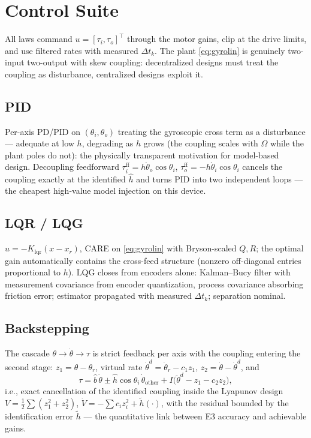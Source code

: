 \documentclass[conference]{IEEEtran}
\begin{document}
\section{Control Suite}
All laws command $u = [\tau_i, \tau_o]^{\!\top}$ through the motor gains, clip at the drive limits, and use filtered rates with measured $\Delta t_k$. The plant \eqref{eq:gyrolin} is genuinely two-input two-output with skew coupling: decentralized designs must treat the coupling as disturbance, centralized designs exploit it.

\subsection{PID}
Per-axis PD/PID on $(\theta_i, \theta_o)$ treating the gyroscopic cross term as a disturbance --- adequate at low $h$, degrading as $h$ grows (the coupling scales with $\Omega$ while the plant poles do not): the physically transparent motivation for model-based design. Decoupling feedforward $\tau_i^{\mathrm{ff}} = h\dot\theta_o\cos\theta_i$, $\tau_o^{\mathrm{ff}} = -h\dot\theta_i\cos\theta_i$ cancels the coupling exactly at the identified $\hat h$ and turns PID into two independent loops --- the cheapest high-value model injection on this device.

\subsection{LQR / LQG}
$u = -K_{\mathrm{lqr}}(x - x_r)$, CARE on \eqref{eq:gyrolin} with Bryson-scaled $Q, R$; the optimal gain automatically contains the cross-feed structure (nonzero off-diagonal entries proportional to $h$). LQG closes from encoders alone: Kalman--Bucy filter with measurement covariance from encoder quantization, process covariance absorbing friction error; estimator propagated with measured $\Delta t_k$; separation nominal.

\subsection{Backstepping}
The cascade $\theta \to \dot\theta \to \tau$ is strict feedback per axis with the coupling entering the second stage: $z_1 = \theta - \theta_r$, virtual rate $\dot\theta^d = \dot\theta_r - c_1 z_1$, $z_2 = \dot\theta - \dot\theta^d$, and
\begin{equation}
\tau = \hat b\,\dot\theta \pm \hat h\cos\theta_i\,\dot\theta_{\mathrm{other}} + I\bigl(\ddot\theta^d - z_1 - c_2 z_2\bigr),
\end{equation}
i.e., exact cancellation of the identified coupling inside the Lyapunov design $V = \tfrac12\sum(z_1^2 + z_2^2)$, $\dot V = -\sum c_i z_i^2 + \tilde h(\cdot)$, with the residual bounded by the identification error $\tilde h$ --- the quantitative link between E3 accuracy and achievable gains.
\end{document}
